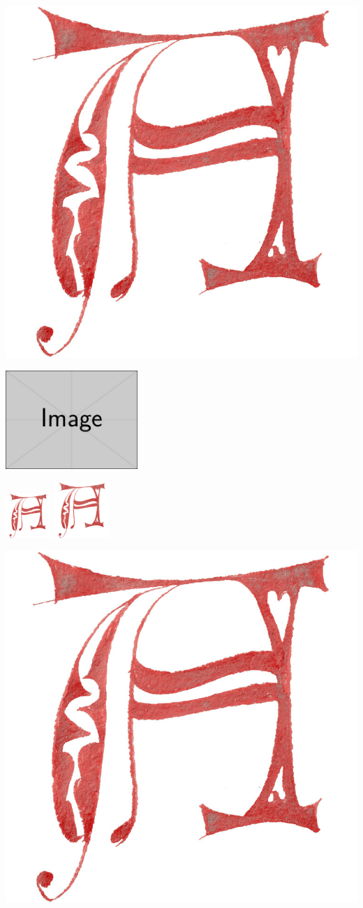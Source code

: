 \documentclass[10pt]{article}
\begin{document}
\includegraphics{A.jpg}

\includegraphics[width=5cm]{example-image.jpg}

\includegraphics[height=48pt]{A.jpg}
\includegraphics[width=60pt]{A.jpg}

\includegraphics[scale=0.5]{A.jpg}
\end{document}
